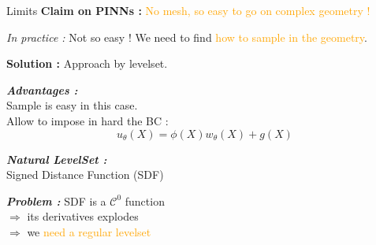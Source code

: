 \begin{frame}{Limits}
	\textbf{Claim on PINNs :} \textcolor{orange}{No mesh, so easy to go on complex geometry !}
	
	\warning \textit{In practice :} Not so easy ! We need to find \textcolor{orange}{how to sample in the geometry}.
	
	\vspace{8pt}
	
	\textbf{Solution :} Approach by levelset.
	
	\begin{center}
	\end{center}
	
	\vspace{5pt}

	\begin{center}
		\begin{minipage}{0.44\linewidth}
			\textbf{\textit{Advantages :}} \\
			 Sample is easy in this case. \\
			 Allow to impose in hard the BC :
			\vspace{-5pt}
			\begin{equation*}
				u_\theta(X)=\phi(X)w_\theta(X)+g(X)
			\end{equation*}
		\end{minipage}
		\begin{minipage}{0.44\linewidth}
			\textbf{\textit{Natural LevelSet :}} \\
			Signed Distance Function (SDF)
			
			\vspace{5pt}
			\textbf{\textit{Problem :}} SDF is a $\mathcal{C}^0$ function  \\
			$\Rightarrow$ its derivatives explodes \\
			$\Rightarrow$ we \textcolor{orange}{need a regular levelset}
		\end{minipage}
	\end{center}
\end{frame}

